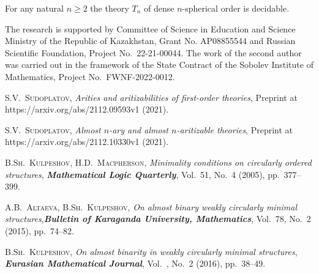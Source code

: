 \documentclass[bsl,meeting]{asl}
\begin{document}
\begin{theorem}\label{th_dec}
For any natural $n\geq 2$ the theory $T_n$ of dense $n$-spherical
order is decidable.
\end{theorem}

The research is supported by Committee of Science in Education and
Science Ministry of the Republic of Kazakhstan, Grant No.
AP08855544 and Russian Scientific Foundation, Project
No.~22-21-00044. The work of the second author was carried out in
the framework of the State Contract of the Sobolev Institute of
Mathematics, Project No.~FWNF-2022-0012.

\begin{thebibliography}{10}

 {\scshape  S.V.~Sudoplatov}, {\itshape Arities and aritizabilities of first-order
theories}, Preprint at https://arxiv.org/abs/2112.09593v1 (2021).

 {\scshape  S.V.~Sudoplatov}, {\itshape Almost $n$-ary and almost $n$-aritizable
theories}, Preprint at https://arxiv.org/abs/2112.10330v1 (2021).

 {\scshape B.Sh.~Kulpeshov, H.D.~Macpherson}, {\itshape Minimality
conditions on circularly ordered structures}, {\bfseries\itshape
Mathematical Logic Quarterly}, Vol.~51, No.~4 (2005),
pp.~377--399.

 {\scshape A.B.~Altaeva, B.Sh.~Kulpeshov},
{\itshape On almost binary weakly circularly minimal
structures},{\bfseries\itshape Bulletin of Karaganda University,
Mathematics}, Vol.~78, No.~2 (2015), pp.~74--82.

 {\scshape B.Sh.~Kulpeshov}, {\itshape On almost binarity in weakly
circularly minimal structures}, {\bfseries\itshape Eurasian
Mathematical Journal}, Vol.~, No.~2 (2016), pp.~38--49.





\end{thebibliography}


\vspace*{-0.5\baselineskip}
\end{document}
